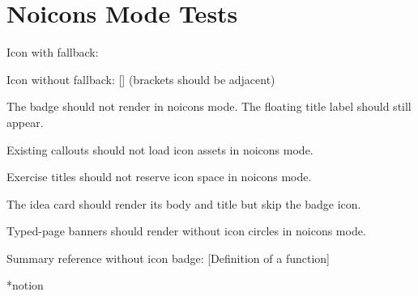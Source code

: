 \documentclass[10pt,a4paper]{article}
\begin{document}
\section*{Noicons Mode Tests}

Icon with fallback: 

Icon without fallback: [] (brackets should be adjacent)

\begin{cardbox}[title={Card without icons}, icon={lightbulb.pdf}, color={blue}]
  The badge should not render in noicons mode.
  The floating title label should still appear.
\end{cardbox}

\begin{tipbox}
  Existing callouts should not load icon assets in noicons mode.
\end{tipbox}

\begin{exguided}
  Exercise titles should not reserve icon space in noicons mode.
\end{exguided}

\begin{ideacard}[title={Idea without badge}]
  The idea card should render its body and title but skip the badge icon.
\end{ideacard}

Typed-page banners should render without icon circles in noicons mode.

Summary reference without icon badge: [Definition of a function]

\begin{indexTypeTable}*{notion}
\end{indexTypeTable}
\end{document}
